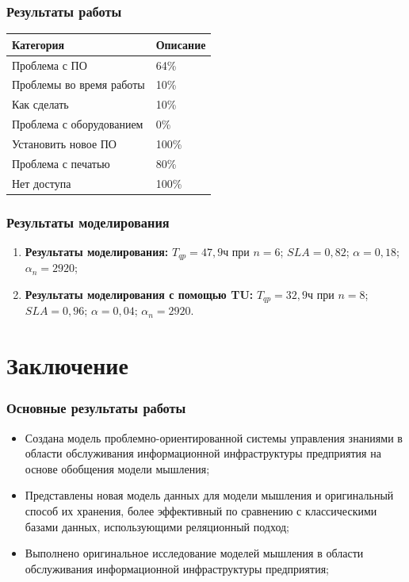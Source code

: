 \documentclass[14pt]{beamer}
\begin{document}
\begin{frame}
\frametitle{Результаты работы}
\begin{table}
	
\small
\begin{tabular} {|p{8cm}|p{2cm}|}

\hline
\textbf{Категория} & \textbf{Описание} \\
\hline
 Проблема с ПО    & 64\% \\
 \hline Проблемы во время работы  &  10\% \\
  \hline Как сделать & 10\% \\
   \hline
Проблема с оборудованием  & 0\% \\
 \hline
Установить новое ПО       & 100\% \\
 \hline Проблема с печатью        & 80\% \\
  \hline Нет доступа               & 100\% \\
  \hline
   \end{tabular}
\end{table}

\end{frame}

\begin{frame}
\frametitle{Результаты моделирования}
\begin{enumerate}
 \item \textbf{Результаты моделирования:} $T_{qp}=47,9ч$ при $n=6$; $SLA=0,82$; $\alpha=0,18$;  $\alpha_n=2920$;
 \item \textbf{Результаты моделирования с помощью TU:} $T_{qp}=32,9ч$ при $n=8$; $SLA=0,96$; $\alpha=0,04$;  $\alpha_n=2920$.
\end{enumerate}
\end{frame}


%
%
\section[Заключение]{Заключение}



\begin{frame}
\frametitle{Основные результаты работы}
\begin{itemize}
   \item Создана модель проблемно-ориентированной системы управления знаниями в области обслуживания информационной инфраструктуры предприятия на основе обобщения модели мышления;
  \item Представлены новая модель данных для модели мышления и оригинальный способ их хранения, более эффективный по сравнению с классическими базами данных, использующими реляционный подход;
  \item  Выполнено оригинальное исследование моделей мышления в области обслуживания информационной инфраструктуры предприятия;
  
\end{itemize}
\end{frame}
\end{document}
